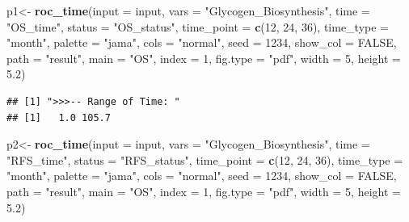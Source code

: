 \documentclass[
  12pt,
]{book}
\newenvironment{Shaded}{\begin{snugshade}}{\end{snugshade}}
\newcommand{\AttributeTok}[1]{\textcolor[rgb]{0.13,0.29,0.53}{#1}}
\newcommand{\ConstantTok}[1]{\textcolor[rgb]{0.56,0.35,0.01}{#1}}
\newcommand{\DecValTok}[1]{\textcolor[rgb]{0.00,0.00,0.81}{#1}}
\newcommand{\FloatTok}[1]{\textcolor[rgb]{0.00,0.00,0.81}{#1}}
\newcommand{\FunctionTok}[1]{\textcolor[rgb]{0.13,0.29,0.53}{\textbf{#1}}}
\newcommand{\NormalTok}[1]{#1}
\newcommand{\OtherTok}[1]{\textcolor[rgb]{0.56,0.35,0.01}{#1}}
\newcommand{\StringTok}[1]{\textcolor[rgb]{0.31,0.60,0.02}{#1}}
\theoremstyle{definition}
\theoremstyle{definition}
\theoremstyle{definition}
\theoremstyle{definition}
\theoremstyle{remark}
\begin{document}
\begin{Shaded}
\begin{Highlighting}[]
\NormalTok{p1}\OtherTok{\textless{}{-}} \FunctionTok{roc\_time}\NormalTok{(}\AttributeTok{input      =}\NormalTok{ input,  }
             \AttributeTok{vars       =} \StringTok{"Glycogen\_Biosynthesis"}\NormalTok{, }
             \AttributeTok{time       =} \StringTok{"OS\_time"}\NormalTok{,}
             \AttributeTok{status     =} \StringTok{"OS\_status"}\NormalTok{, }
             \AttributeTok{time\_point =} \FunctionTok{c}\NormalTok{(}\DecValTok{12}\NormalTok{, }\DecValTok{24}\NormalTok{, }\DecValTok{36}\NormalTok{), }
             \AttributeTok{time\_type  =} \StringTok{"month"}\NormalTok{,}
             \AttributeTok{palette    =} \StringTok{"jama"}\NormalTok{,}
             \AttributeTok{cols       =} \StringTok{"normal"}\NormalTok{,}
             \AttributeTok{seed       =} \DecValTok{1234}\NormalTok{, }
             \AttributeTok{show\_col   =} \ConstantTok{FALSE}\NormalTok{, }
             \AttributeTok{path       =} \StringTok{"result"}\NormalTok{, }
             \AttributeTok{main       =} \StringTok{"OS"}\NormalTok{,}
             \AttributeTok{index      =} \DecValTok{1}\NormalTok{,}
             \AttributeTok{fig.type   =} \StringTok{"pdf"}\NormalTok{,}
             \AttributeTok{width      =} \DecValTok{5}\NormalTok{,}
             \AttributeTok{height     =} \FloatTok{5.2}\NormalTok{)}
\end{Highlighting}
\end{Shaded}

\begin{verbatim}
## [1] ">>>-- Range of Time: "
## [1]   1.0 105.7
\end{verbatim}

\begin{Shaded}
\begin{Highlighting}[]
\NormalTok{p2}\OtherTok{\textless{}{-}} \FunctionTok{roc\_time}\NormalTok{(}\AttributeTok{input      =}\NormalTok{ input,  }
             \AttributeTok{vars       =} \StringTok{"Glycogen\_Biosynthesis"}\NormalTok{, }
             \AttributeTok{time       =} \StringTok{"RFS\_time"}\NormalTok{,}
             \AttributeTok{status     =} \StringTok{"RFS\_status"}\NormalTok{, }
             \AttributeTok{time\_point =} \FunctionTok{c}\NormalTok{(}\DecValTok{12}\NormalTok{, }\DecValTok{24}\NormalTok{, }\DecValTok{36}\NormalTok{), }
             \AttributeTok{time\_type  =} \StringTok{"month"}\NormalTok{,}
             \AttributeTok{palette    =} \StringTok{"jama"}\NormalTok{,}
             \AttributeTok{cols       =} \StringTok{"normal"}\NormalTok{,}
             \AttributeTok{seed       =} \DecValTok{1234}\NormalTok{, }
             \AttributeTok{show\_col   =} \ConstantTok{FALSE}\NormalTok{, }
             \AttributeTok{path       =} \StringTok{"result"}\NormalTok{, }
             \AttributeTok{main       =} \StringTok{"OS"}\NormalTok{,}
             \AttributeTok{index      =} \DecValTok{1}\NormalTok{,}
             \AttributeTok{fig.type   =} \StringTok{"pdf"}\NormalTok{,}
             \AttributeTok{width      =} \DecValTok{5}\NormalTok{,}
             \AttributeTok{height     =} \FloatTok{5.2}\NormalTok{)}
\end{Highlighting}
\end{Shaded}
\end{document}
